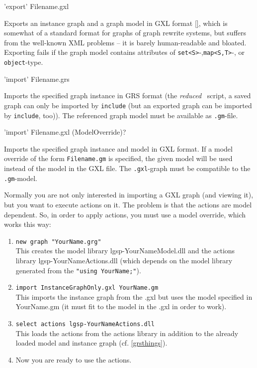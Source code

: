 \begin{rail}
  'export' Filename.gxl
\end{rail}
Exports an instance graph and a graph model in GXL format \ref{}, which is somewhat of a standard format for graphs of graph rewrite systems, but suffers from the well-known XML problems -- it is barely human-readable and bloated.
Exporting fails if the graph model contains attributes of \texttt{set<S>}-,\texttt{map<S,T>}-, or \texttt{object}-type.

\begin{rail}
  'import' Filename.grs
\end{rail}
Imports the specified graph instance in GRS format (the \emph{reduced} \GrShell\ script, a saved graph can only be imported by \texttt{include} (but an exported graph can be imported by \texttt{include}, too)).
The referenced graph model must be available as \texttt{.gm}-file.

\begin{rail}
  'import' Filename.gxl (ModelOverride)?
\end{rail}
Imports the specified graph instance and model in GXL format.
If a model override of the form \texttt{Filename.gm} is specified, the given model will be used instead of the model in the GXL file.
The \texttt{.gxl}-graph must be compatible to the \texttt{.gm}-model.

\begin{note}\label{shellgxlimport}
Normally you are not only interested in importing a GXL graph (and viewing it), but you want to execute actions on it.
The problem is that the actions are model dependent.
So, in order to apply actions, you must use a model override, which works this way:
\begin{enumerate}
\item \texttt{new graph "YourName.grg"}\\
This creates the model library lgsp-YourNameModel.dll
and the actions library lgsp-YourNameActions.dll
(which depends on the model library generated from the \texttt{"using YourName;"}).
\item \texttt{import InstanceGraphOnly.gxl YourName.gm}\\
This imports the instance graph from the .gxl but uses the model specified
in YourName.gm (it must fit to the model in the .gxl in order to work).
\item \texttt{select actions lgsp-YourNameActions.dll}\\
This loads the actions from the actions library in addition to the already
loaded model and instance graph (cf. \ref{grsthings}).
\item Now you are ready to use the actions.
\end{enumerate}
\end{note}


